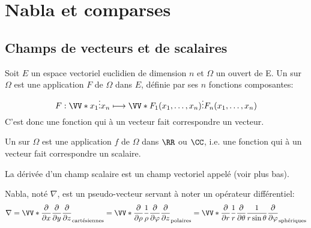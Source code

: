 \medskip
\section{Nabla et comparses}
\subsection{Champs de vecteurs et de scalaires}
\begin{definition}
Soit $E$ un espace vectoriel euclidien
de dimension $n$ et $\Omega$ un ouvert de E.
Un  sur $\Omega$ est une application $F$ de $\Omega$ dans $E$,
définie par ses $n$ fonctions composantes:
\begin{equation}
    F : \VV*{x_1\\\vdots\\x_n} \longmapsto \VV*{F_1(x_1,\dots,x_n)\\ \vdots\\ F_n(x_1,\dots,x_n)}
\end{equation}
C'est donc une fonction qui à un vecteur fait correspondre un vecteur.
\end{definition}
\medskip
\begin{definition}
Un  sur $\Omega$ est une application $f$ de $\Omega$ dans $\RR$ ou $\CC$,
i.e. une fonction qui à un vecteur fait correspondre un scalaire.
\end{definition}
La dérivée d'un champ scalaire est un champ vectoriel appelé  (voir plus bas).

\medskip
{} Nabla, noté $\nabla$, est un pseudo-vecteur  servant à noter un opérateur
différentiel:
\begin{equation}
\nabla  = \VV*{{\dfrac\partial{\partial x}}\\ \dfrac\partial{\partial y}\\ \dfrac\partial{\partial z}}_{\text{cartésiennes}}
= \VV*{\dfrac\partial{\partial \rho}\\ \dfrac1\rho \dfrac\partial{\partial \varphi}\\ \dfrac\partial{\partial z}}_{\text{polaires}}
= \VV*{\dfrac\partial{\partial r}\\ \dfrac1r \dfrac\partial{\partial \theta}\\\dfrac1{r\sin\theta} \dfrac\partial{\partial \varphi}}_{\text{sphériques}}
\end{equation}

